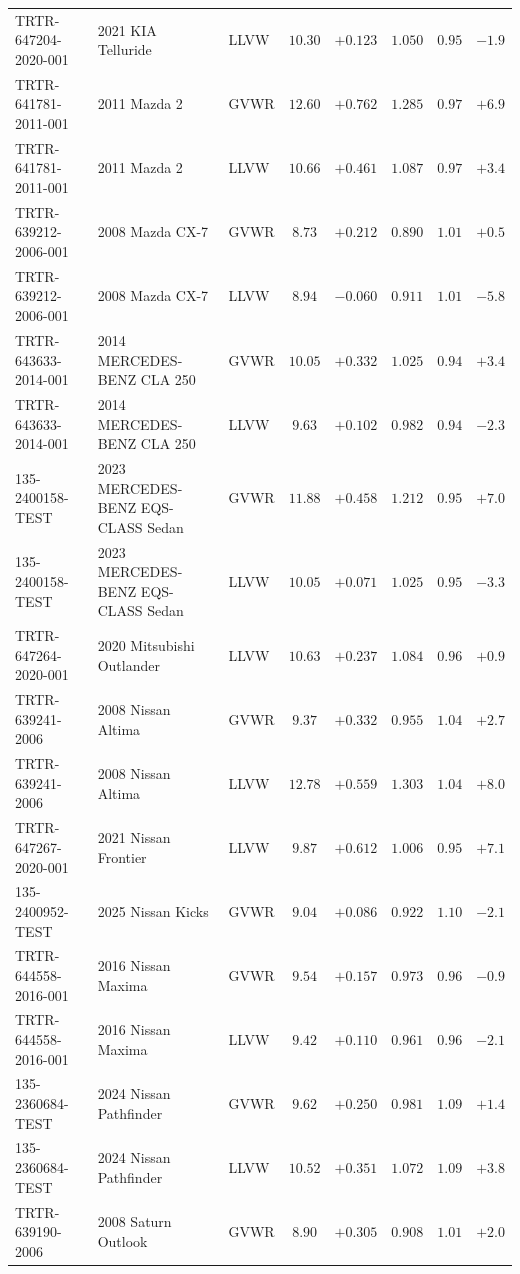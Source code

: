 {\begin{longtable}{lp{2.9cm}lccccc}
TRTR-647204-2020-001 & 2021 KIA Telluride & LLVW & $10.30$ & $+0.123$ & $1.050$ & $0.95$ & $-1.9$\\
TRTR-641781-2011-001 & 2011 Mazda 2 & GVWR & $12.60$ & $+0.762$ & $1.285$ & $0.97$ & $+6.9$\\
TRTR-641781-2011-001 & 2011 Mazda 2 & LLVW & $10.66$ & $+0.461$ & $1.087$ & $0.97$ & $+3.4$\\
TRTR-639212-2006-001 & 2008 Mazda CX-7 & GVWR & $8.73$ & $+0.212$ & $0.890$ & $1.01$ & $+0.5$\\
TRTR-639212-2006-001 & 2008 Mazda CX-7 & LLVW & $8.94$ & $-0.060$ & $0.911$ & $1.01$ & $-5.8$\\
TRTR-643633-2014-001 & 2014 MERCEDES-BENZ CLA 250 & GVWR & $10.05$ & $+0.332$ & $1.025$ & $0.94$ & $+3.4$\\
TRTR-643633-2014-001 & 2014 MERCEDES-BENZ CLA 250 & LLVW & $9.63$ & $+0.102$ & $0.982$ & $0.94$ & $-2.3$\\
135-2400158-TEST & 2023 MERCEDES-BENZ EQS-CLASS Sedan & GVWR & $11.88$ & $+0.458$ & $1.212$ & $0.95$ & $+7.0$\\
135-2400158-TEST & 2023 MERCEDES-BENZ EQS-CLASS Sedan & LLVW & $10.05$ & $+0.071$ & $1.025$ & $0.95$ & $-3.3$\\
TRTR-647264-2020-001 & 2020 Mitsubishi Outlander & LLVW & $10.63$ & $+0.237$ & $1.084$ & $0.96$ & $+0.9$\\
TRTR-639241-2006 & 2008 Nissan Altima & GVWR & $9.37$ & $+0.332$ & $0.955$ & $1.04$ & $+2.7$\\
TRTR-639241-2006 & 2008 Nissan Altima & LLVW & $12.78$ & $+0.559$ & $1.303$ & $1.04$ & $+8.0$\\
TRTR-647267-2020-001 & 2021 Nissan Frontier & LLVW & $9.87$ & $+0.612$ & $1.006$ & $0.95$ & $+7.1$\\
135-2400952-TEST & 2025 Nissan Kicks & GVWR & $9.04$ & $+0.086$ & $0.922$ & $1.10$ & $-2.1$\\
TRTR-644558-2016-001 & 2016 Nissan Maxima & GVWR & $9.54$ & $+0.157$ & $0.973$ & $0.96$ & $-0.9$\\
TRTR-644558-2016-001 & 2016 Nissan Maxima & LLVW & $9.42$ & $+0.110$ & $0.961$ & $0.96$ & $-2.1$\\
135-2360684-TEST & 2024 Nissan Pathfinder & GVWR & $9.62$ & $+0.250$ & $0.981$ & $1.09$ & $+1.4$\\
135-2360684-TEST & 2024 Nissan Pathfinder & LLVW & $10.52$ & $+0.351$ & $1.072$ & $1.09$ & $+3.8$\\
TRTR-639190-2006 & 2008 Saturn Outlook & GVWR & $8.90$ & $+0.305$ & $0.908$ & $1.01$ & $+2.0$\\

\end{longtable}}
